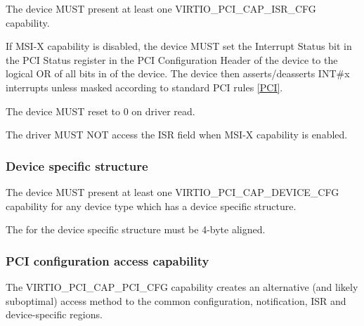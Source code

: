 The device MUST present at least one VIRTIO_PCI_CAP_ISR_CFG capability.  

If MSI-X capability is disabled, the device MUST set the Interrupt Status
bit in the PCI Status register in the PCI Configuration Header of
the device to the logical OR of all bits in  of
the device.  The device then asserts/deasserts INT\#x interrupts unless masked
according to standard PCI rules \hyperref[intro:PCI]{[PCI]}.

The device MUST reset  to 0 on driver read.


The driver MUST NOT access the ISR field when MSI-X capability
is enabled.

\subsubsection{Device specific structure}\label{sec:Virtio Transport Options / Virtio Over PCI Bus / PCI Device Layout / Device specific structure}

The device MUST present at least one VIRTIO_PCI_CAP_DEVICE_CFG capability for
any device type which has a device specific structure.


The  for the device specific structure must be 4-byte aligned.

\subsubsection{PCI configuration access capability}\label{sec:Virtio Transport Options / Virtio Over PCI Bus / PCI Device Layout / PCI configuration access capability}

The VIRTIO_PCI_CAP_PCI_CFG capability
creates an alternative (and likely suboptimal) access method to the
common configuration, notification, ISR and device-specific regions.


